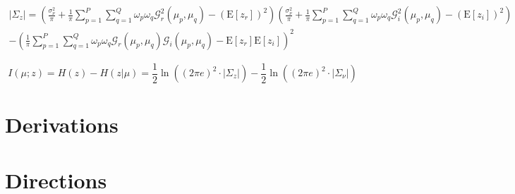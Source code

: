 \documentclass{article}         %
\theoremstyle{definition}
\theoremstyle{remark}
\newcommand{\Gscript}{\mathcal{G}}
\newcommand{\paren}[1]{\left(#1\right)}
\newcommand{\expect}[1]{\mathrm{E}\left[#1\right]}
\newcommand{\sumpp}{\sum\limits_{p=1}^P}
\newcommand{\sumqq}{\sum\limits_{q=1}^Q}
\begin{document}
\begin{multline}
	\lvert\Sigma_z\rvert = \paren{\frac{\sigma_\nu^2}{\pi}+\frac{1}{\pi}\sumpp\sumqq\omega_p\omega_q\Gscript_r^2\paren{\mu_p,\mu_q}-\paren{\expect{z_r}}^2}\paren{\frac{\sigma_\nu^2}{\pi}+\frac{1}{\pi}\sumpp\sumqq\omega_p\omega_q\Gscript_i^2\paren{\mu_p,\mu_q}-\paren{\expect{z_i}}^2}\\
	-\paren{\frac{1}{\pi}\sumpp\sumqq\omega_p\omega_q\Gscript_r\paren{\mu_p,\mu_q}\Gscript_i\paren{\mu_p,\mu_q}-\expect{z_r}\expect{z_i}}^2
\end{multline}

\begin{equation}
	I\left(\mu;z\right) = H\left(z\right) - H\left(z|\mu\right) 
	= \frac{1}{2}\ln\left(\left(2\pi e\right)^2\cdot\lvert\Sigma_z\rvert\right) - \frac{1}{2}\ln\left(\left(2\pi e\right)^2\cdot\lvert\Sigma_\nu\rvert\right)
\end{equation}


\section{Derivations}\label{Derivations}



\section{Directions}\label{Directions}
\end{document}
